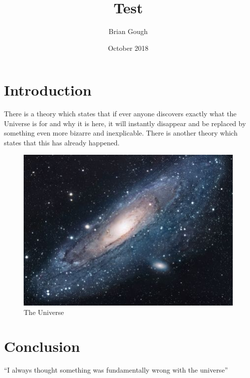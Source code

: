 \documentclass{article}
\title{Test}
\author{Brian Gough}
\date{October 2018}
\begin{document}
\maketitle

\section{Introduction}
There is a theory which states that if ever anyone discovers exactly what the Universe is for and why it is here, it will instantly disappear and be replaced by something even more bizarre and inexplicable.
There is another theory which states that this has already happened.

\begin{figure}[h!]
\centering
\includegraphics[scale=1.7]{universe}
\caption{The Universe}
\label{fig:universe}
\end{figure}

\section{Conclusion}
``I always thought something was fundamentally wrong with the universe'' \citep{adams1995hitchhiker}



\end{document}
